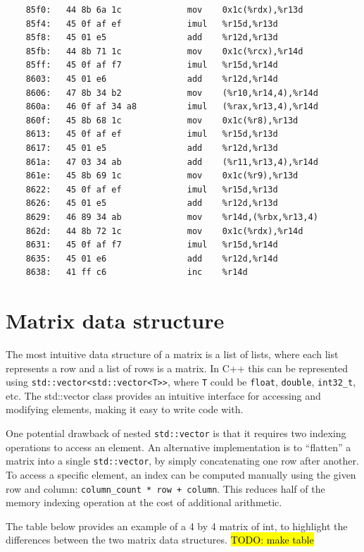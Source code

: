\documentclass[logo,bsc,singlespacing,parskip]{infthesis}
\begin{document}
\begin{verbatim}
    85f0:	44 8b 6a 1c          	mov    0x1c(%rdx),%r13d
    85f4:	45 0f af ef          	imul   %r15d,%r13d
    85f8:	45 01 e5             	add    %r12d,%r13d
    85fb:	44 8b 71 1c          	mov    0x1c(%rcx),%r14d
    85ff:	45 0f af f7          	imul   %r15d,%r14d
    8603:	45 01 e6             	add    %r12d,%r14d
    8606:	47 8b 34 b2          	mov    (%r10,%r14,4),%r14d
    860a:	46 0f af 34 a8       	imul   (%rax,%r13,4),%r14d
    860f:	45 8b 68 1c          	mov    0x1c(%r8),%r13d
    8613:	45 0f af ef          	imul   %r15d,%r13d
    8617:	45 01 e5             	add    %r12d,%r13d
    861a:	47 03 34 ab          	add    (%r11,%r13,4),%r14d
    861e:	45 8b 69 1c          	mov    0x1c(%r9),%r13d
    8622:	45 0f af ef          	imul   %r15d,%r13d
    8626:	45 01 e5             	add    %r12d,%r13d
    8629:	46 89 34 ab          	mov    %r14d,(%rbx,%r13,4)
    862d:	44 8b 72 1c          	mov    0x1c(%rdx),%r14d
    8631:	45 0f af f7          	imul   %r15d,%r14d
    8635:	45 01 e6             	add    %r12d,%r14d
    8638:	41 ff c6             	inc    %r14d
\end{verbatim}

\section{Matrix data structure}

The most intuitive data structure of a matrix is a list of lists, where each
list represents a row and a list of rows is a matrix. In C++ this can be
represented using \texttt{std::vector<std::vector<T>>}, where \texttt{T} could
be \texttt{float}, \texttt{double}, \texttt{int32\_t}, etc. The std::vector
class provides an intuitive interface for accessing and modifying elements,
making it easy to write code with. 

One potential drawback of nested \texttt{std::vector} is that it requires two
indexing operations to access an element. An alternative implementation is to
“flatten” a matrix into a single \texttt{std::vector}, by simply concatenating
one row after another. To access a specific element, an index can be computed
manually using the given row and column: \texttt{column\_count * row + column}.
This reduces half of the memory indexing operation at the cost of additional
arithmetic. 

The table below provides an example of a 4 by 4 matrix of int, to highlight the
differences between the two matrix data structures. 
\hl{TODO: make table}
\end{document}
